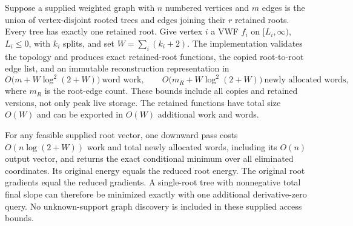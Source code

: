\begin{theorem}
\label{thm:op3-persistent-vwf-forest}
Suppose a supplied weighted graph with $n$ numbered vertices and $m$ edges
is the union of vertex-disjoint rooted trees and edges joining their $r$
retained roots. Every tree has exactly one retained root. Give vertex $i$
a VWF $f_i$ on $[L_i,\infty)$, $L_i\leq0$, with $k_i$ splits, and set
$W=\sum_i(k_i+2)$. The implementation validates the topology and produces
exact retained-root functions, the copied root-to-root edge list, and an
immutable reconstruction representation in
\begin{equation}
 O\bigl(m+W\log^2(2+W)\bigr)\ \text{word work},\qquad
 O\bigl(m_R+W\log^2(2+W)\bigr)\ \text{newly allocated words},
 \label{eq:op3-persistent-vwf-forest-work}
\end{equation}
where $m_R$ is the root-edge count. These bounds include all copies and
retained versions, not only peak live storage. The retained functions have
total size $O(W)$ and can be exported in $O(W)$ additional work and words.

For any feasible supplied root vector, one downward pass costs
$O(n\log(2+W))$ work and total newly allocated words, including its
$O(n)$ output vector, and returns the exact
conditional minimum over all eliminated coordinates. Its original energy
equals the reduced root energy. The original root gradients equal the
reduced gradients. A single-root tree with nonnegative total final slope
can therefore be minimized exactly with one additional derivative-zero
query. No unknown-support graph discovery is included in these supplied
access bounds.
\end{theorem}
